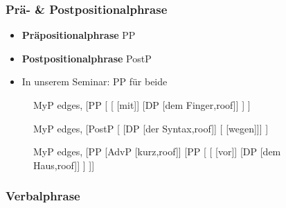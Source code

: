 \begin{frame}
\frametitle{Prä- \& Postpositionalphrase}

\begin{itemize}
	\item \textbf{Präpositionalphrase} \ras PP
	\item \textbf{Postpositionalphrase} \ras PostP
	\item In unserem Seminar: PP für beide
\end{itemize}

\begin{figure}[b]
  	\begin{minipage}[b]{0.30\textwidth}
	\centering
	\footnotesize{
		\begin{forest}
		MyP edges,
		[PP [
				[ [mit]]
				[DP [dem Finger,roof]]
			]
		]
		\end{forest}
		}
  	\end{minipage}  
  	\pause            
	\begin{minipage}[b]{0.30\textwidth}
	\centering
	\footnotesize{
		\begin{forest}
		MyP edges,
		[PostP [ [DP [der Syntax,roof]]
							[\zerobar{Post} [wegen]]]
		]	 
		\end{forest}
		}
  	\end{minipage}
 	\pause            
	\begin{minipage}[b]{0.30\textwidth}
	\centering
	\footnotesize{
		\begin{forest}
		MyP edges,
		[PP
		[AdvP [kurz,roof]]
		[PP [\MyPxbar{P}
				[\zerobar{P} [vor]]
				[DP [dem Haus,roof]]
			]
		]]
		\end{forest}
		}
  	\end{minipage}  
\end{figure}
\end{frame}


\subsubsection{Verbalphrase}

